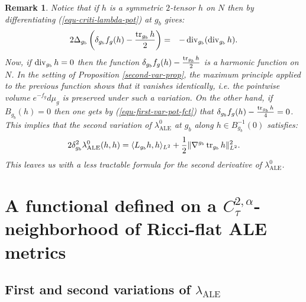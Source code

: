 \documentclass[a4paper,11pt,reqno]{amsart}
\newtheorem{rk}[defn]{Remark}
\def\tr{\mathop{\rm tr}\nolimits}
\def\div{\mathop{\rm div}\nolimits}
\def\tr{\mathop{\rm tr}\nolimits}
\def\div{\mathop{\rm div}\nolimits}
\numberwithin{equation}{section}
\begin{document}
	\begin{rk}\label{remark jauge div}
		Notice that if $h$ is a symmetric $2$-tensor $h$ on $N$ then by differentiating (\ref{equ-criti-lambda-pot}) at $g_b$ gives:
		\begin{eqnarray}
		2\Delta_{g_b}\left(\delta_{g_b}f_{g}(h)-\frac{\tr_{g_b}h}{2}\right)&=&-\div_{g_b}(\div_{g_b}h).\label{equ-first-var-pot-fct}
		\end{eqnarray}
		Now, if $\div_{g_b}h=0$ then the function $\delta_{g_b}f_{g}(h)-\frac{\tr_{g_b}h}{2}$ is a harmonic function on $N$. In the setting of Proposition \ref{second-var-prop}, the maximum principle applied to the previous function shows that it vanishes identically, i.e. the pointwise volume $e^{-f_g}d\mu_g$ is preserved under such a variation. On the other hand, if $B_{g_b}(h)=0$ then one gets by (\ref{equ-first-var-pot-fct}) that $\delta_{g_b}f_{g}(h)-\frac{\tr_{g_b}h}{4}=0$. This implies that the second variation of $\lambda_{\operatorname{ALE}}^0$ at $g_b$ along $h\in B_{g_b}^{-1}(0)$ satisfies:
		\begin{equation*}
		2\delta^2_{g_b}\lambda_{\operatorname{ALE}}^0(h,h)=\langle L_{g_b}h,h\rangle_{L^2}+\frac{1}{2}\|\nabla^{g_b}\tr_{g_b}h\|^2_{L^2}.
		\end{equation*}
		This leaves us with a less tractable formula for the second derivative of $\lambda_{\operatorname{ALE}}^0$.
	\end{rk}
	

	
	
	\section{A functional defined on a $C^{2,\alpha}_\tau$-neighborhood of Ricci-flat ALE metrics}\label{extension tilde lambda}
	\subsection{First and second variations of $\lambda_{\operatorname{ALE}}$}~~\\
	
\end{document}

